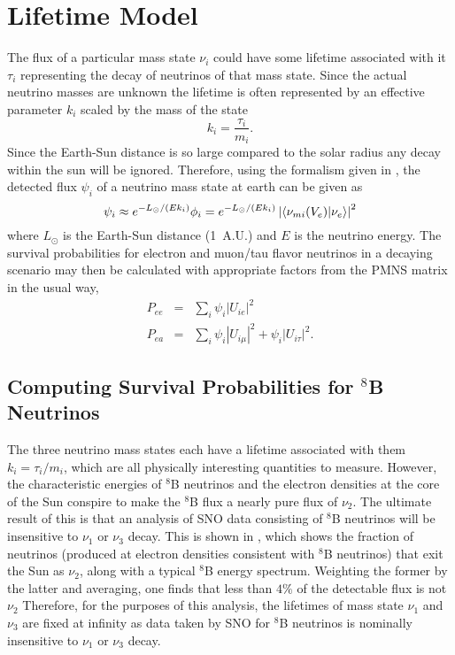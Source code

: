 \section{Lifetime Model}
\label{lifetime_model}

The flux of a particular mass state $\nu_i$ could have some lifetime associated with it $\tau_i$ representing the decay of neutrinos of that mass state.
Since the actual neutrino masses are unknown the lifetime is often represented by an effective parameter $k_i$ scaled by the mass of the state
\begin{equation}
k_i = \frac{\tau_i}{m_i}.
\end{equation}
Since the Earth-Sun distance is so large compared to the solar radius any decay within the sun will be ignored. 
Therefore, using the formalism given in , the detected flux $\psi_i$ of a neutrino mass state at earth can be given as 
\begin{equation}
\psi_i \approx  e^{-L_\odot / (E k_i)} \phi_i =  e^{-L_\odot / (E k_i)} \left| \braket{\nu_{m i}(V_e)}{\nu_e} \right|^2
\label{decay}
\end{equation}
where $L_\odot$ is the Earth-Sun distance (1~A.U.) and $E$ is the neutrino energy.
The survival probabilities for electron and muon/tau flavor neutrinos in a decaying scenario may then be calculated with appropriate factors from the PMNS matrix in the usual way,
\begin{equation}
\begin{array}{rcl}
P_{ee} & = & \sum_i \psi_i |U_{ie}|^2  \\
P_{ea} & = & \sum_i \psi_i |U_{i\mu}|^2 + \psi_i |U_{i\tau}|^2.
\end{array}
\label{survive}
\end{equation}

\subsection{Computing Survival Probabilities for \texorpdfstring{$^8$B}{Boron-8} Neutrinos}

\label{montecarlo}

The three neutrino mass states each have a lifetime associated with them $k_i = \tau_i / m_i$, which are all physically interesting quantities to measure.
However, the characteristic energies of $^8$B neutrinos and the electron densities at the core of the Sun conspire to make the $^8$B flux a nearly pure flux of $\nu_2$.
The ultimate result of this is that an analysis of SNO data consisting of $^8$B neutrinos will be insensitive to $\nu_1$ or $\nu_3$ decay.
This is shown in , which shows the fraction of neutrinos (produced at electron densities consistent with $^8$B neutrinos) that exit the Sun as $\nu_2$, along with a typical $^8$B energy spectrum.
Weighting the former by the latter and averaging, one finds that less than $4\%$ of the detectable flux is not $\nu_2$
Therefore, for the purposes of this analysis, the lifetimes of mass state $\nu_1$ and $\nu_3$ are fixed at infinity as data taken by SNO for $^8$B neutrinos is nominally insensitive to $\nu_1$ or $\nu_3$ decay.

